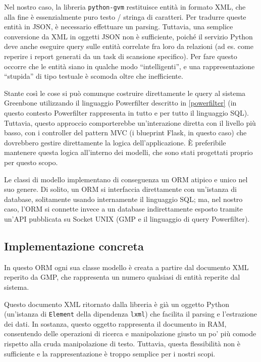 Nel nostro caso, la libreria \texttt{python-gvm} restituisce entità in formato XML, che alla fine è essenzialmente puro testo / stringa di caratteri. Per tradurre queste entità in JSON, è necessario effettuare un parsing. Tuttavia, una semplice conversione da XML in oggetti JSON non è sufficiente, poiché il servizio Python deve anche eseguire query sulle entità correlate fra loro da relazioni (ad es. come reperire i report generati da un task di scansione specifico). Per fare questo occorre che le entità siano in qualche modo ``intelligenti'', e una rappresentazione ``stupida'' di tipo testuale è scomoda oltre che inefficiente.

Stante così le cose si può comunque costruire direttamente le query al sistema Greenbone utilizzando il linguaggio Powerfilter descritto in \ref{powerfilter} (in questo contesto Powerfilter rappresenta in tutto e per tutto il linguaggio SQL). Tuttavia, questo approccio comporterebbe un'interazione diretta con il livello più basso, con i controller del pattern MVC (i blueprint Flask, in questo caso) che dovrebbero gestire direttamente la logica dell'applicazione. È preferibile mantenere questa logica all'interno dei modelli, che sono stati progettati proprio per questo scopo.

Le classi di modello implementano di conseguenza un ORM atipico e unico nel suo genere. Di solito, un ORM si interfaccia direttamente con un'istanza di database, solitamente usando internamente il linguaggio SQL; ma, nel nostro caso, l'ORM si connette invece a un database indirettamente esposto tramite un'API pubblicata su Socket UNIX (GMP e il linguaggio di query Powerfilter).

\subsection{Implementazione concreta}
In questo ORM ogni sua classe modello è creata a partire dal documento XML reperito da GMP, che rappresenta un numero qualsiasi di entità reperite dal sistema.

Questo documento XML ritornato dalla libreria è già un oggetto Python (un'istanza di \texttt{Element} della dipendenza \texttt{lxml}) che facilita il parsing e l'estrazione dei dati. In sostanza, questo oggetto rappresenta il documento in RAM, consentendo delle operazioni di ricerca e manipolazione giusto un po' più comode rispetto alla cruda manipolazione di testo. Tuttavia, questa flessibilità non è sufficiente e la rappresentazione è troppo semplice per i nostri scopi.

